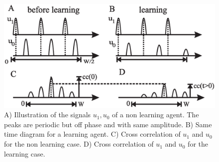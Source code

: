 \begin{figure}[htbp]
\begin{center}
\includegraphics[width=0.6 \textwidth]{figures/infomeasure/simple/temporalsignal.eps}
\end{center}
\begin{small}
\caption[Temporal signal development during learning]{A) Illustration of the signals $u_1,u_0$
of a non learning agent. The peaks are periodic but off phase and with same amplitude.
B) Same time diagram for a learning agent. C) Cross correlation of $u_1$ and $u_0$ for the non learning case.
D) Cross correlation of $u_1$ and $u_0$ for the learning case. \label{methods:xcorr}}

\end{small}
\end{figure}

